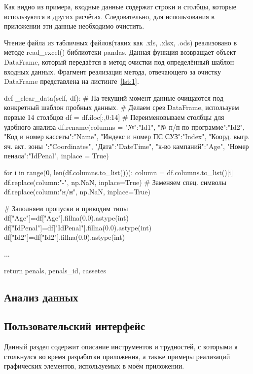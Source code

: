 Как видно из примера, входные данные содержат строки и столбцы, которые используются в других расчётах. Следовательно, для использования в приложении эти данные необходимо очистить. 

Чтение файла из табличных файлов(таких как .xls, .xlsx, .ods) реализовано в методе read\_excel() библиотеки pandas. Данная функция возвращает объект DataFrame, который передаётся в метод очистки под определённый шаблон входных данных. Фрагмент реализация метода, отвечающего за очистку DataFrame представлена на листинге~\ref{lst:1}. 

\begin{flushleft}
 \label{lst:1}
\begin{MyCodes}
def _clear_data(self, df):
	# На текущий момент данные очищаются под конкретный шаблон пробных данных.
	# Делаем срез DataFrame, используем первые 14 столбцов
	df = df.iloc[:,0:14] 
	# Переименовываем столбцы для удобного анализа
	df.rename(columns = {
		"№":"Id1",
		"№ п/п по программе":"Id2",
		"Код  и номер кассеты":"Name",
		"Индекс и номер ПС СУЗ":"Index",
		"Коорд. выгр. яч. акт. зоны ":"Coordinates",
		"Дата":"DateTime",
		"к-во кампаний":"Age",
		"Номер пенала":"IdPenal"}, inplace = True)
	
	for i in range(0, len(df.columns.to_list())):
		column = df.columns.to_list()[i]
		df.replace({column:"-"}, np.NaN, inplace=True) # Заменяем спец. символы
		df.replace({column:"н/н"}, np.NaN, inplace=True)
	
	# Заполняем пропуски и приводим типы
	df["Age"]=df["Age"].fillna(0.0).astype(int)
	df["IdPenal"]=df["IdPenal"].fillna(0.0).astype(int)
	df["Id2"]=df["Id2"].fillna(0.0).astype(int)
	
	...
	
	return penals, penals_id, cassetes

\end{MyCodes}
\end{flushleft}

\subsection{Анализ данных}

\subsection{Пользовательский интерфейс}

Данный раздел содержит описание инструментов и трудностей, с которыми я столкнулся во время разработки приложения, а также примеры реализаций графических элементов, используемых в моём приложении.

